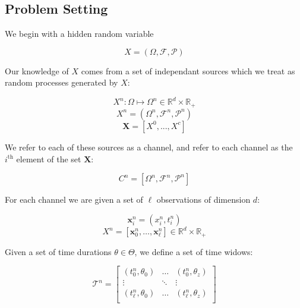 \documentclass[10pt]{article}
\begin{document}


\subsection{Problem Setting}
We begin with a hidden random variable 

\[ X = (\Omega,\mathcal{F},\mathcal{P}) \]

Our knowledge of \( X \) comes from a set of independant sources which we treat as random processes generated by \( X \):

\[ X^n : \Omega \mapsto \Omega^n \in \mathbb{R}^d \times \mathbb{R}_+  \]
\[ X^n = (\Omega^n,\mathcal{F}^n,\mathcal{P}^n) \]
\[ \mathbf{X} = [X^0,...,X^c]   \]

We refer to each of these sources as a channel, and refer to each channel as the \( i^\text{th} \) element of the set \( \mathbf{X} \):

\[ C^n = [\Omega^n,\mathcal{F}^n,\mathcal{P}^n] \]

For each channel we are given a set of \( \ell \) observations of dimension \( d \):

\[ \mathbf{x}_i^n = (x_i^n, t_i^n ) \]
\[ X^n = \left[ \mathbf{x}_0^n,\hdots,\mathbf{x}_\ell^n \right] \in \mathbb{R}^d \times \mathbb{R}_+ \]

Given a set of time durations \( \theta \in \Theta \), we define a set of time widows:

\[  \mathcal{T}^n =  
\begin{bmatrix} 
(t_0^n,\theta_0) & \hdots & (t_0^n,\theta_z) \\
\vdots & \ddots & \vdots \\
(t_\ell^n, \theta_0) & \hdots & (t_\ell^n, \theta_z) \\
\end{bmatrix} 
\]
\end{document}
